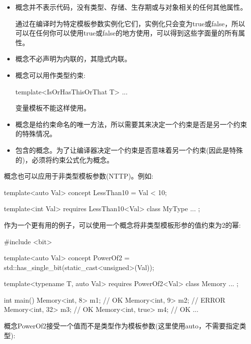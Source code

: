 \begin{itemize}
\item
概念并不表示代码，没有类型、存储、生存期或与对象相关的任何其他属性。

通过在编译时为特定模板参数实例化它们，实例化只会变为true或false，所以可以在任何你可以使用true或false的地方使用，可以得到这些字面量的所有属性。

\item
概念不必声明为内联的，其隐式内联。

\item
概念可以用作类型约束:

\begin{cpp}
template<IsOrHasThisOrThat T>
...
\end{cpp}

变量模板不能这样使用。

\item
概念是给约束命名的唯一方法，所以需要其来决定一个约束是否是另一个约束的特殊情况。

\item
包含的概念。为了让编译器决定一个约束是否意味着另一个约束(因此是特殊的)，必须将约束公式化为概念。
\end{itemize}


概念也可以应用于非类型模板参数(NTTP)。例如:

\begin{cpp}
template<auto Val>
concept LessThan10 = Val < 10;

template<int Val>
requires LessThan10<Val>
class MyType {
	...
};
\end{cpp}

作为一个更有用的例子，可以使用一个概念将非类型模板形参的值约束为2的幂:


\begin{cpp}
#include <bit>

template<auto Val>
concept PowerOf2 = std::has_single_bit(static_cast<unsigned>(Val));

template<typename T, auto Val>
requires PowerOf2<Val>
class Memory {
	...
};

int main()
{
	Memory<int, 8> m1; // OK
	Memory<int, 9> m2; // ERROR
	Memory<int, 32> m3; // OK
	Memory<int, true> m4; // OK
	...
}
\end{cpp}

概念PowerOf2接受一个值而不是类型作为模板参数(这里使用auto，不需要指定类型):

